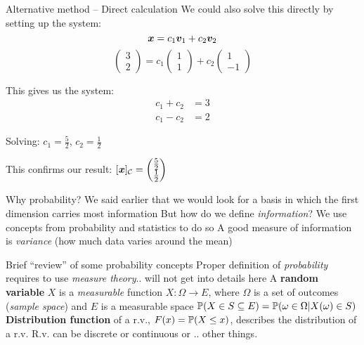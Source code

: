\documentclass[aspectratio=169]{beamer}\usepackage[]{graphicx}\usepackage[]{xcolor}
\begin{document}
\begin{frame}{Alternative method -- Direct calculation}
We could also solve this directly by setting up the system:
$$\bm{x} = c_1\bm{v}_1 + c_2\bm{v}_2$$
$$\begin{pmatrix} 3 \\ 2 \end{pmatrix} = c_1\begin{pmatrix} 1 \\ 1 \end{pmatrix} + c_2\begin{pmatrix} 1 \\ -1 \end{pmatrix}$$

This gives us the system:
\begin{align*}
c_1 + c_2 &= 3 \\
c_1 - c_2 &= 2
\end{align*}

Solving: $c_1 = \frac{5}{2}$, $c_2 = \frac{1}{2}$

\vfill
This confirms our result: $[\bm{x}]_{\mathcal{C}} = \begin{pmatrix} \frac{5}{2} \\ \frac{1}{2} \end{pmatrix}$
\end{frame}




\begin{frame}{Why probability?}
We said earlier that we would look for a basis in which the first dimension carries most information
\vfill
But how do we define \emph{information}?
\vfill
We use concepts from probability and statistics to do so
\vfill
A good measure of information is \emph{variance} (how much data varies around the mean)
\end{frame} 

\begin{frame}{Brief ``review'' of some probability concepts}
Proper definition of \emph{probability} requires to use \emph{measure theory}.. will not get into details here
\vfill
A \textbf{random variable} $X$ is a \emph{measurable} function $X:\Omega\to E$, where $\Omega$ is a set of outcomes (\emph{sample space}) and $E$ is a measurable space
\vfill
$\mathbb{P}(X\in S\subseteq E) = \mathbb{P}(\omega\in\Omega|X(\omega)\in S)$
\vfill
\textbf{Distribution function} of a r.v., $F(x)=\mathbb{P}(X\leq x)$, describes the distribution of a r.v.
\vfill
R.v. can be discrete or continuous or .. other things. 
\end{frame}
\end{document}
